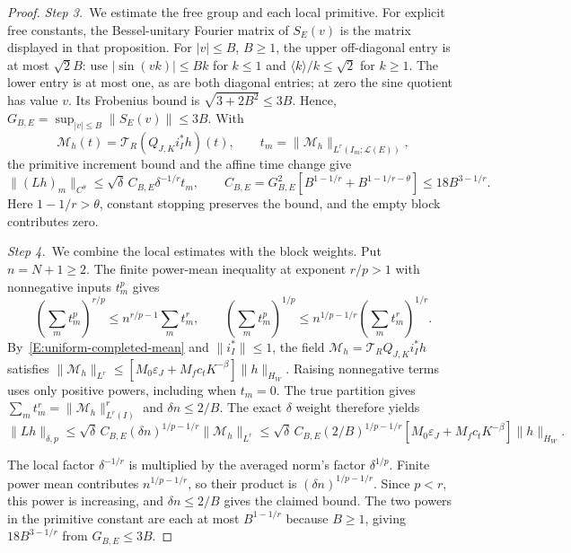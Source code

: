 \begin{proof}
  \medskip
  \noindent\textit{Step 3.~}We estimate the free group and each local
  primitive.
  For explicit free constants, the Bessel-unitary Fourier matrix of $S_E(v)$ is
  the matrix displayed in that proposition. For $|v| \le B$, $B \ge 1$, the
  upper off-diagonal entry is at most $\sqrt2 B$: use $|\sin(vk)| \le Bk$ for $k
  \le 1$ and $\langle k\rangle/k \le \sqrt2$ for $k \ge 1$. The lower entry is
  at most one, as are both diagonal entries; at zero the sine quotient has value
  $v$. Its Frobenius bound is $\sqrt{3+2B^2} \le 3B$. Hence, $G_{B,E} =
  \sup_{|v|\le B}\|S_E(v)\| \le 3B$. With
  \[
    \mathcal{M}_h(t)=\mathcal{T}_R(Q_{J,K}i_I^*h)(t),\qquad
    t_m=\|\mathcal{M}_h\|_{L^r(I_m;\mathcal{L}(E))},
  \]
  the primitive increment bound and the affine time change give
  \[
    \|(Lh)_m\|_{C^\theta}
    \le\sqrt\delta\,C_{B,E}\delta^{-1/r}t_m,\qquad
    C_{B,E}=G_{B,E}^2[B^{1-1/r}+B^{1-1/r-\theta}]
    \le18B^{3-1/r}.
  \]
  Here $1-1/r > \theta$, constant stopping preserves the bound, and the empty
  block contributes zero.


  \medskip
  \noindent\textit{Step 4.~}We combine the local estimates with the block
  weights.
  Put $n = N+1 \ge 2$. The finite power-mean inequality at exponent $r/p > 1$
  with nonnegative inputs $t_m^p$ gives
  \[
    \left(\sum_m t_m^p\right)^{r/p}
    \le n^{r/p-1}\sum_m t_m^r,\qquad
    \left(\sum_m t_m^p\right)^{1/p}
    \le n^{1/p-1/r}\left(\sum_m t_m^r\right)^{1/r}.
  \]
  By~\eqref{E:uniform-completed-mean} and $\|i_I^*\|\le1$, the field
  $\mathcal{M}_h=\mathcal{T}_RQ_{J,K}i_I^*h$ satisfies
  $\|\mathcal{M}_h\|_{L^r}\le
  [M_0\varepsilon_J+M_fc_tK^{-\beta}]\|h\|_{H_W}$.
  Raising nonnegative terms uses only positive powers, including when $t_m = 0$.
  The true partition gives $\sum_m t_m^r = \|\mathcal{M}_h\|_{L^r(I)}^r$ and
  $\delta n \le 2/B$. The exact $\delta$ weight therefore yields
  \[
    \|Lh\|_{\delta,p}
    \le\sqrt\delta\,C_{B,E}(\delta n)^{1/p-1/r}\|\mathcal{M}_h\|_{L^r}
    \le\sqrt\delta\,C_{B,E}(2/B)^{1/p-1/r}
    [M_0\varepsilon_J+M_fc_tK^{-\beta}]\|h\|_{H_W}.
  \]

  The local factor $\delta^{-1/r}$ is multiplied by the averaged norm's factor
  $\delta^{1/p}$. Finite power mean contributes $n^{1/p-1/r}$, so their
  product is $(\delta n)^{1/p-1/r}$. Since $p<r$, this power is increasing,
  and $\delta n\le2/B$ gives the claimed bound. The two powers in the
  primitive constant are each at most $B^{1-1/r}$ because $B\ge1$, giving
  $18B^{3-1/r}$ from $G_{B,E}\le3B$.


\end{proof}
